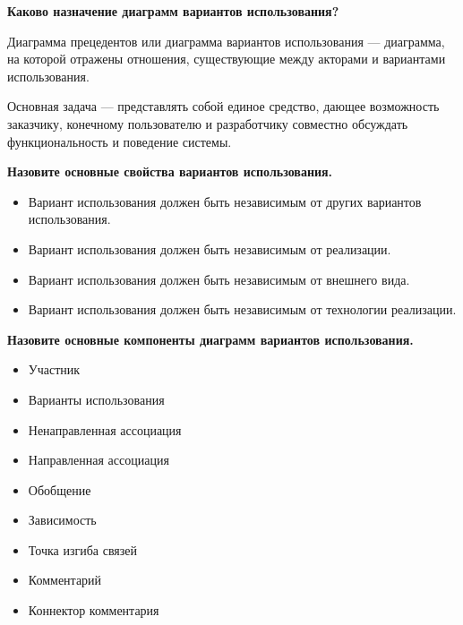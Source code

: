 \textbf{Каково назначение диаграмм вариантов использования?}\par
Диаграмма прецедентов или диаграмма вариантов использования — диаграмма, на которой отражены отношения,
существующие между акторами и вариантами использования.\par
Основная задача — представлять собой единое средство, дающее возможность заказчику, конечному пользователю и
разработчику совместно обсуждать функциональность и поведение системы.\par

\textbf{Назовите основные свойства вариантов использования.}\par
\begin{itemize}
	\item Вариант использования должен быть независимым от других вариантов использования.
	\item Вариант использования должен быть независимым от реализации.
	\item Вариант использования должен быть независимым от внешнего вида.
	\item Вариант использования должен быть независимым от технологии реализации.
\end{itemize}
\par

\textbf{Назовите основные компоненты диаграмм вариантов использования.}\par
\begin{itemize}
	\item Участник
	\item Варианты использования
	\item Ненаправленная ассоциация
	\item Направленная ассоциация
	\item Обобщение
	\item Зависимость
	\item Точка изгиба связей
	\item Комментарий
	\item Коннектор комментария
\end{itemize}

